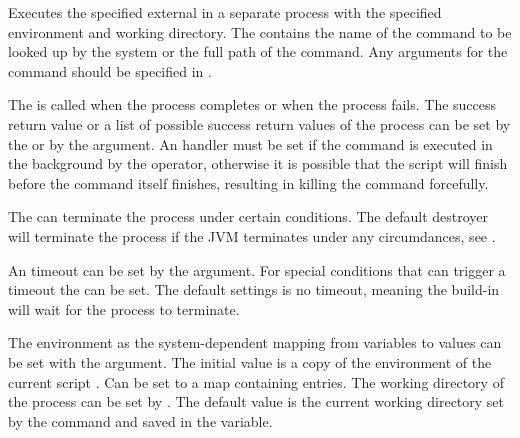 %


Executes the specified external  in a separate process with the
specified environment and working directory. The  contains the
name of the command to be looked up by the system or the full path of the command.
Any arguments for the command should be specified in .

The  is called when the process completes or when the process 
fails. The success return value
or a list of possible success return values of the process can be set by 
the  or by the  argument.
An handler must be set if the command is executed in the background by the 
operator, otherwise it is possible that the script will finish before the command itself finishes,
resulting in killing the command forcefully.

The  can terminate the process under certain conditions.
The default destroyer will terminate the process if the JVM terminates under
any circumdances, see \cite{addshutdownhook13}.

An timeout can be set by the  argument. For special conditions
that can trigger a timeout the  can be set. The default settings
is no timeout, meaning the build-in will wait for the process to terminate.

The environment as the system-dependent mapping from variables
to values can be set with the  argument. The initial value is a copy 
of the environment of the current script . Can be set to a map 
containing  entries.
The working directory of the process can be set by . The default value
is the current working directory set by the  command
and saved in the  variable.

